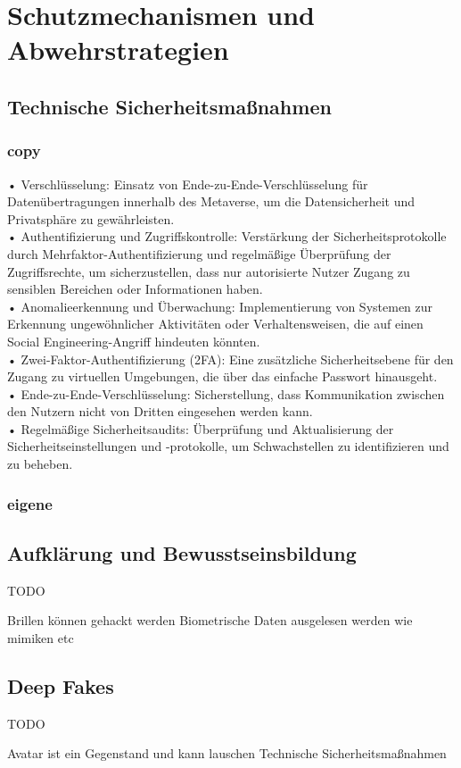 \chapter{Schutzmechanismen und Abwehrstrategien}\label{ch:SchutzmechanismenundAbwehrstrategien}

\section{Technische Sicherheitsmaßnahmen}
\subsection*{copy}
• Verschlüsselung: Einsatz von Ende-zu-Ende-Verschlüsselung für Datenübertragungen innerhalb des Metaverse, um die Datensicherheit und Privatsphäre zu gewährleisten.\\
• Authentifizierung und Zugriffskontrolle: Verstärkung der Sicherheitsprotokolle durch Mehrfaktor-Authentifizierung und regelmäßige Überprüfung der Zugriffsrechte, um sicherzustellen, dass nur autorisierte Nutzer Zugang zu sensiblen Bereichen oder Informationen haben.\\
• Anomalieerkennung und Überwachung: Implementierung von Systemen zur Erkennung ungewöhnlicher Aktivitäten oder Verhaltensweisen, die auf einen Social Engineering-Angriff hindeuten könnten.\\

• Zwei-Faktor-Authentifizierung (2FA): Eine zusätzliche Sicherheitsebene für den Zugang zu virtuellen Umgebungen, die über das einfache Passwort hinausgeht.\\
• Ende-zu-Ende-Verschlüsselung: Sicherstellung, dass Kommunikation zwischen den Nutzern nicht von Dritten eingesehen werden kann.\\
• Regelmäßige Sicherheitsaudits: Überprüfung und Aktualisierung der Sicherheitseinstellungen und -protokolle, um Schwachstellen zu identifizieren und zu beheben.\\


\subsection*{eigene}


\section{Aufklärung und Bewusstseinsbildung}
TODO

Brillen können gehackt werden Biometrische Daten ausgelesen werden wie mimiken etc 

\section{Deep Fakes}
TODO

Avatar ist ein Gegenstand und kann lauschen
Technische Sicherheitsmaßnahmen
